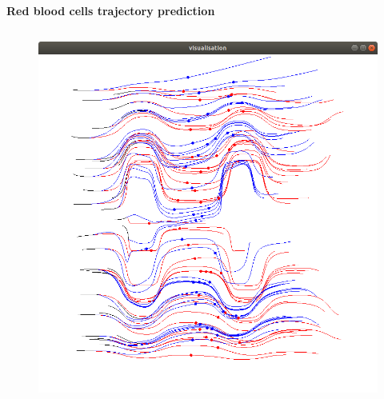 \documentclass[xcolor=dvipsnames]{beamer}
\begin{document}
\begin{frame}{\bf Red blood cells trajectory prediction}
\begin{columns}
    \begin{column}{0.5\textwidth}  %
    \begin{figure}
      \includegraphics[scale=0.12]{../../diagrams/rbc_deep_network_6.png}
    \end{figure}
    \end{column}

\end{columns}




\end{frame}
\end{document}
